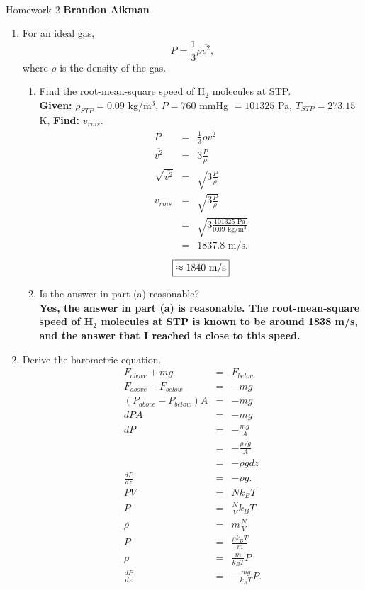 \documentclass[12pt]{article}
\begin{document}
 \\
Homework 2 \hfill {\bf Brandon Aikman}

\begin{enumerate}
	\item For an ideal gas, $$P = \frac{1}{3}\rho \overline{v^2},$$ where $\rho$ is the density of the gas.
	\begin{enumerate}
		\item Find the root-mean-square speed of H$_2$ molecules at STP. \\
		\textbf {Given: } $\rho _{STP}  = 0.09$ kg/m$^3$, $P = 760$ mmHg $= 101325$ Pa, $T_{STP} = 273.15$ K, \textbf{Find: }$v_{rms}$.
		\begin{eqnarray*}
			P &=& \frac{1}{3}\rho \overline{v^2}\\
			\overline{v^2} &=& 3 \frac{P}{\rho}\\
			\sqrt{\overline{v^2}} &=& \sqrt{3\frac{P}{\rho}}\\
			v_{rms} &=& \sqrt{3 \frac{P}{\rho}}\\
			&=& \sqrt{3\frac{101325 \mbox{ Pa}}{0.09 \mbox{ kg/m$^3$}}}\\
			&=& 1837.8\mbox{ m/s}.
		\end{eqnarray*}
		$$\fbox{$\approx 1840 \mbox{ m/s}$}$$		
		\item Is the answer in part (a) reasonable? \\
			\textbf{Yes, the answer in part (a) is reasonable. The root-mean-square speed of H$_2$ molecules at STP is known to be around 1838 m/s, and the answer that I reached is close to this speed.}
		
	\end{enumerate}	
	
    \item Derive the barometric equation.
    \begin{eqnarray*}
		F_{above} + mg &=& F_{below}\\
		F_{above} - F_{below} &=& -mg\\
		(P_{above} - P_{below})A &=& -mg\\
		dPA &=& -mg\\
		dP &=& -\frac{mg}{A}\\
		&=& -\frac{\rho V g}{A}\\
		&=& -\rho g dz\\
		\frac{dP}{dz} &=& -\rho g.\\
		PV &=& Nk_BT\\
		P &=& \frac{N}{V}k_BT\\
		\rho &=& m\frac{N}{V}\\
		P &=& \frac{\rho k_BT}{m}\\
		\rho &=& \frac{m}{k_BT}P\\
		\frac{dP}{dz} &=& -\frac{mg}{k_BT}P.
	\end{eqnarray*}
\end{enumerate}
\end{document}
